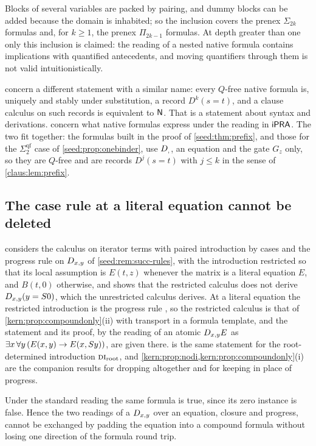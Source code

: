 Blocks of several variables are packed by pairing, and dummy blocks can be
added because the domain is inhabited; so the inclusion covers the prenex
$\Sigma_{2k}$ formulas and, for $k\geq1$, the prenex $\Pi_{2k-1}$ formulas.
At depth greater than one only this inclusion is claimed: the reading of a
nested native formula contains implications with quantified antecedents, and
moving quantifiers through them is not valid intuitionistically.

\begin{remark}
\label{seed:rem:prefix-claus}
 concern a different statement with
a similar name: every $Q$-free native formula is, uniquely and stably under
substitution, a record $D^k(s=t)$, and a clause calculus on such records is
equivalent to $\mathsf{N}$. That is a statement about syntax and derivations.
 concern what native formulas
express under the reading in $\mathsf{iPRA}$. The two fit together: the formulas
built in the proof of \cref{seed:thm:prefix}, and those for the
$\Sigma_2^{\mathrm{qf}}$ case of \cref{seed:prop:onebinder}, use $D_{,}$, an
equation and the gate $G_z$ only, so they are $Q$-free and are records $D^{j}(s=t)$ with $j\leq k$ in the sense of
\cref{claus:lem:prefix}.
\end{remark}

\subsection{The case rule at a literal equation cannot be deleted}

\begin{remark}\label{seed:prop:atomic-case}
 considers the calculus on iterator terms with paired
introduction by cases and the progress rule on $D_{x,y}$ of
\cref{seed:rem:succ-rules}, with the introduction restricted so that its
local assumption is $E(t,z)$ whenever the matrix is a literal equation $E$,
and $B(t,0)$ otherwise, and shows that the restricted calculus does not
derive $D_{x,y}(y=S 0)$, which the unrestricted calculus derives. At a
literal equation the restricted introduction is the progress rule
, so the restricted calculus is that of
\cref{kern:prop:compoundonly}(ii) with transport in a formula template, and
the statement and its proof, by the reading of an atomic $D_{x,y}E$ as
$\exists x\,\forall y\,(E(x,y)\to E(x,S y))$, are given there.
 is the same statement for the root-determined
introduction $\rulename{DI}_{\mathrm{root}}$, and
\cref{kern:prop:nodi,kern:prop:compoundonly}(i) are the companion results
for dropping  altogether and for keeping  in place
of progress.

Under the standard reading the same formula is true, since its zero instance
is false. Hence the two readings of a $D_{x,y}$ over an equation, closure
and progress, cannot be exchanged by padding the equation into a compound
formula without losing one direction of the formula round trip.
\end{remark}

